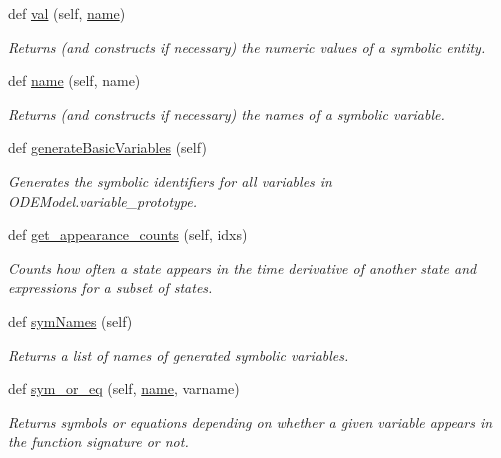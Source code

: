 \begin{DoxyCompactItemize}
def \mbox{\hyperlink{classamici_1_1ode__export_1_1_o_d_e_model_a8d081fd7c43cbb2bce7b4eca67fb94c5}{val}} (self, \mbox{\hyperlink{classamici_1_1ode__export_1_1_o_d_e_model_a4d110acf8e52c4d48044071ea06952c0}{name}})
\begin{DoxyCompactList}\small\item\em Returns (and constructs if necessary) the numeric values of a symbolic entity. \end{DoxyCompactList}\item 
def \mbox{\hyperlink{classamici_1_1ode__export_1_1_o_d_e_model_a4d110acf8e52c4d48044071ea06952c0}{name}} (self, name)
\begin{DoxyCompactList}\small\item\em Returns (and constructs if necessary) the names of a symbolic variable. \end{DoxyCompactList}\item 
def \mbox{\hyperlink{classamici_1_1ode__export_1_1_o_d_e_model_af3b774d51a546704413dc57f93dc427d}{generate\+Basic\+Variables}} (self)
\begin{DoxyCompactList}\small\item\em Generates the symbolic identifiers for all variables in O\+D\+E\+Model.\+variable\+\_\+prototype. \end{DoxyCompactList}\item 
def \mbox{\hyperlink{classamici_1_1ode__export_1_1_o_d_e_model_a5e124f15318e0b6217db8290b3bbe3b4}{get\+\_\+appearance\+\_\+counts}} (self, idxs)
\begin{DoxyCompactList}\small\item\em Counts how often a state appears in the time derivative of another state and expressions for a subset of states. \end{DoxyCompactList}\item 
def \mbox{\hyperlink{classamici_1_1ode__export_1_1_o_d_e_model_a2223bbe62f3234b8f40c5a566064a481}{sym\+Names}} (self)
\begin{DoxyCompactList}\small\item\em Returns a list of names of generated symbolic variables. \end{DoxyCompactList}\item 
def \mbox{\hyperlink{classamici_1_1ode__export_1_1_o_d_e_model_ae352b13e8ea2f390c5fa146601817173}{sym\+\_\+or\+\_\+eq}} (self, \mbox{\hyperlink{classamici_1_1ode__export_1_1_o_d_e_model_a4d110acf8e52c4d48044071ea06952c0}{name}}, varname)
\begin{DoxyCompactList}\small\item\em Returns symbols or equations depending on whether a given variable appears in the function signature or not. \end{DoxyCompactList}\item 

\end{DoxyCompactItemize}
